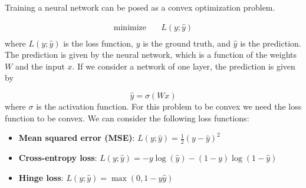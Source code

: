 Training a neural network can be posed as a convex optimization problem. 

\begin{equation}
    \begin{aligned}
        \text{minimize} \quad& L(y; \hat{y}) \\
    \end{aligned}
\end{equation}
%
where $L(y; \hat{y})$ is the loss function, $y$ is the ground truth, and $\hat{y}$ is the prediction. The prediction is given by the neural network, which is a function of the weights $W$ and the input $x$. If we consider a network of one layer, the prediction is given by

\begin{equation}
    \hat{y} = \sigma(Wx)
\end{equation}
%
where $\sigma$ is the activation function. For this problem to be convex we need the loss function to be convex. We can consider the following loss functions:
\begin{itemize}
    \item \textbf{Mean squared error (MSE)}: $L(y; \hat{y}) = \frac{1}{2} (y - \hat{y})^2$
    \item \textbf{Cross-entropy loss}: $L(y; \hat{y}) = -y \log(\hat{y}) - (1 - y) \log(1 - \hat{y})$
    \item \textbf{Hinge loss}: $L(y; \hat{y}) = \max(0, 1 - y \hat{y})$
\end{itemize}

